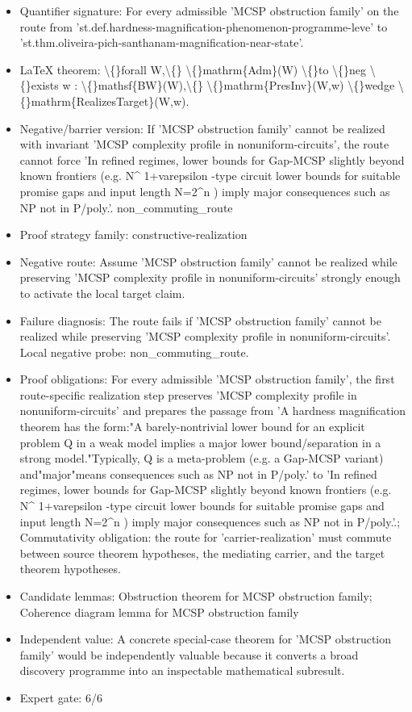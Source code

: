 \documentclass[11pt]{article}
\begin{document}
\begin{itemize}
\item Quantifier signature: For every admissible 'MCSP obstruction family' on the route from 'st.def.hardness-magnification-phenomenon-programme-leve' to 'st.thm.oliveira-pich-santhanam-magnification-near-state'.
\item LaTeX theorem: \textbackslash\{\}forall W,\textbackslash\{\} \textbackslash\{\}mathrm\{Adm\}(W) \textbackslash\{\}to \textbackslash\{\}neg \textbackslash\{\}exists w : \textbackslash\{\}mathsf\{BW\}(W),\textbackslash\{\} \textbackslash\{\}mathrm\{PresInv\}(W,w) \textbackslash\{\}wedge \textbackslash\{\}mathrm\{RealizesTarget\}(W,w).
\item Negative/barrier version: If 'MCSP obstruction family' cannot be realized with invariant 'MCSP complexity profile in nonuniform-circuits', the route cannot force 'In refined regimes, lower bounds for Gap-MCSP slightly beyond known frontiers (e.g. N\textasciicircum{} 1+varepsilon -type circuit lower bounds for suitable promise gaps and input length N=2\textasciicircum{}n ) imply major consequences such as NP not in P/poly.'. non\_commuting\_route
\item Proof strategy family: constructive-realization
\item Negative route: Assume 'MCSP obstruction family' cannot be realized while preserving 'MCSP complexity profile in nonuniform-circuits' strongly enough to activate the local target claim.
\item Failure diagnosis: The route fails if 'MCSP obstruction family' cannot be realized while preserving 'MCSP complexity profile in nonuniform-circuits'. Local negative probe: non\_commuting\_route.
\item Proof obligations: For every admissible 'MCSP obstruction family', the first route-specific realization step preserves 'MCSP complexity profile in nonuniform-circuits' and prepares the passage from 'A hardness magnification theorem has the form:"A barely-nontrivial lower bound for an explicit problem Q in a weak model implies a major lower bound/separation in a strong model."Typically, Q is a meta-problem (e.g. a Gap-MCSP variant) and"major"means consequences such as NP not in P/poly.' to 'In refined regimes, lower bounds for Gap-MCSP slightly beyond known frontiers (e.g. N\textasciicircum{} 1+varepsilon -type circuit lower bounds for suitable promise gaps and input length N=2\textasciicircum{}n ) imply major consequences such as NP not in P/poly.'.; Commutativity obligation: the route for 'carrier-realization' must commute between source theorem hypotheses, the mediating carrier, and the target theorem hypotheses.
\item Candidate lemmas: Obstruction theorem for MCSP obstruction family; Coherence diagram lemma for MCSP obstruction family
\item Independent value: A concrete special-case theorem for 'MCSP obstruction family' would be independently valuable because it converts a broad discovery programme into an inspectable mathematical subresult.
\item Expert gate: 6/6
\end{itemize}
\end{document}
